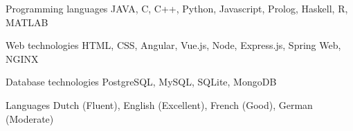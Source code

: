 

\begin{cvskills}

    \cvskill
    {Programming languages} %
    {JAVA, C, C++, Python, Javascript, Prolog, Haskell, R, MATLAB} %

  \cvskill
    {Web technologies} %
    {HTML, CSS, Angular, Vue.js, Node, Express.js, Spring Web, NGINX} %

  \cvskill
    {Database technologies} %
    {PostgreSQL, MySQL, SQLite, MongoDB} %

  \cvskill
    {Languages} %
    {Dutch (Fluent), English (Excellent), French (Good), German (Moderate)} %

\end{cvskills}
